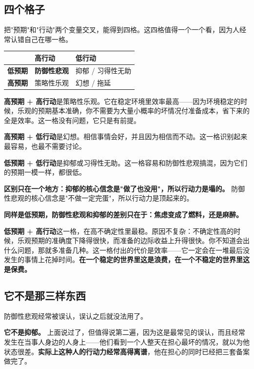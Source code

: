 \documentclass[11pt,a4paper]{ctexart}
\begin{document}
\subsection{四个格子}

把"预期"和"行动"两个变量交叉，能得到四格。这四格值得一个一个看，因为人经常认错自己在哪一格。

\begin{center}

\begin{tabularx}{\textwidth}{lXX}
\toprule
 & 高行动 & 低行动 \\
\midrule
\textbf{低预期} & \textbf{防御性悲观} & 抑郁 / 习得性无助 \\
\textbf{高预期} & 策略性乐观 & 幻想 / 拖延 \\
\bottomrule
\end{tabularx}
\end{center}

\textbf{高预期 + 高行动}是策略性乐观。它在稳定环境里效率最高——因为环境稳定的时候，乐观的预期基本准确，你不需要为大量小概率的坏情况付准备成本，省下来的全是效率。这一格没有问题，它只是有前提。

\textbf{高预期 + 低行动}是幻想。相信事情会好，并且因为相信而不动。这一格识别起来最容易，也最不需要讨论。

\textbf{低预期 + 低行动}是抑郁或习得性无助。这一格容易和防御性悲观搞混，因为它们的预期一模一样，都很低。

\textbf{区别只在一个地方：抑郁的核心信念是"做了也没用"，所以行动力是塌的。} 防御性悲观的核心信念是"不做一定完蛋"，所以行动力是顶起来的。

\textbf{同样是低预期，防御性悲观和抑郁的差别只在于：焦虑变成了燃料，还是麻醉。}

\textbf{低预期 + 高行动}这一格，在高不确定性里最稳。原因不复杂：不确定性高的时候，乐观预期的准确度下降得很快，而准备的边际收益上升得很快。你不知道会出什么问题，那就多准备几种。这一格付出的代价是效率——它一定会在一堆最后没发生的事情上花掉时间。\textbf{在一个稳定的世界里这是浪费，在一个不稳定的世界里这是保费。}

\subsection{它不是那三样东西}

防御性悲观经常被误认，误认之后就没法用了。

\textbf{它不是抑郁。} 上面说过了，但值得说第二遍，因为这是最常见的误认，而且经常发生在当事人身边的人身上——他们看到一个人整天在担心最坏的情况，就以为他状态很差。\textbf{实际上这种人的行动力经常高得离谱}，他在担心的同时已经把三套备案做完了。
\end{document}
